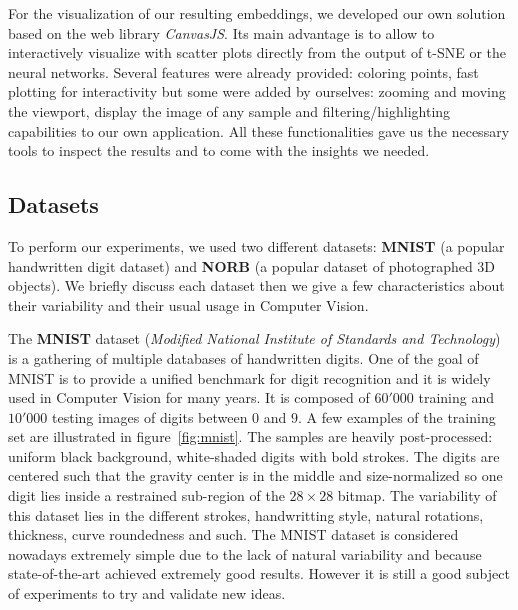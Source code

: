 \documentclass[a4paper,12pt]{report}
\begin{document}
For the visualization of our resulting embeddings, we developed our own solution based on the web library {\em CanvasJS}.
Its main advantage is to allow to interactively visualize with scatter plots directly from the output of t-SNE or the neural networks.
Several features were already provided: coloring points, fast plotting for interactivity but some were added by ourselves: zooming and moving the viewport, display the image of any sample and filtering/highlighting capabilities to our own application.
All these functionalities gave us the necessary tools to inspect the results and to come with the insights we needed.

\subsection{Datasets}
To perform our experiments, we used two different datasets: {\bf MNIST}\cite{lecun1998mnist} (a popular handwritten digit dataset) and {\bf NORB}\cite{lecun2004learning} (a popular dataset of photographed 3D objects).
We briefly discuss each dataset then we give a few characteristics about their variability and their usual usage in Computer Vision.

The {\bf MNIST} dataset ({\em Modified National Institute of Standards and Technology}) is a gathering of multiple databases of handwritten digits.
One of the goal of MNIST is to provide a unified benchmark for digit recognition and it is widely used in Computer Vision for many years.
It is composed of $60'000$ training and $10'000$ testing images of digits between $0$ and $9$.
A few examples of the training set are illustrated in figure~\ref{fig:mnist}.
The samples are heavily post-processed: uniform black background, white-shaded digits with bold strokes.
The digits are centered such that the gravity center is in the middle and size-normalized so one digit lies inside a restrained sub-region of the $28 \times 28$ bitmap.
The variability of this dataset lies in the different strokes, handwritting style, natural rotations, thickness, curve roundedness and such.
The MNIST dataset is considered nowadays extremely simple due to the lack of natural variability and because state-of-the-art achieved extremely good results.
However it is still a good subject of experiments to try and validate new ideas.
\end{document}

